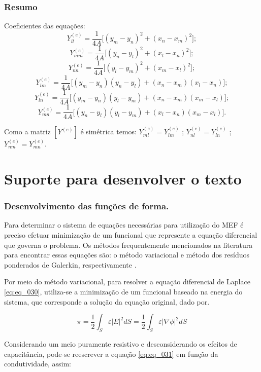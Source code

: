 \documentclass[
12pt,
a4paper,
oneside,
chapter=TITLE,
sumario=tradicional
]{abntex2}
\begin{document}
\subsection*{Resumo}


Coeficientes das equações:
$$
\boxed{Y_{ll}^{(e)} = \frac{1}{4A}\Big[(y_m - y_n)^2 + (x_n - x_m)^2\Big]; }
$$
$$
\boxed{Y_{mm}^{(e)} = \frac{1}{4A}\Big[(y_n - y_l)^2 + (x_l - x_n)^2\Big]; }
$$
$$
\boxed{Y_{nn}^{(e)} = \frac{1}{4A}\Big[(y_l - y_m)^2 + (x_m - x_l)^2\Big]; }
$$
$$
\boxed{Y_{lm}^{(e)} = \frac{1}{4A} \Big[ (y_m - y_n)(y_n - y_l) + (x_n - x_m)(x_l - x_n) \Big]; }
$$
$$
\boxed{Y_{ln}^{(e)} = \frac{1}{4A}\Big[(y_m - y_n)(y_l - y_m) + (x_n - x_m)(x_m - x_l)\Big]; }
$$
$$
\boxed{Y_{mn}^{(e)} = \frac{1}{4A}\Big[(y_n - y_l)(y_l - y_m) + (x_l - x_n)(x_m - x_l)\Big]. }
$$

Como a matriz $[Y^{(e)}]$ é simétrica temos:  $Y_{ml}^{(e)} = Y_{lm}^{(e)}$ ; $Y_{nl}^{(e)} = Y_{ln}^{(e)}$ ; $Y_{nm}^{(e)} = Y_{mn}^{(e)}$.






\chapter{Suporte para desenvolver o texto} \label{App:Suporte}
\subsection*{Desenvolvimento das funções de forma.}

Para determinar o sistema de equações necessárias para utilização do MEF é preciso efetuar  minimização de um funcional que represente a equação diferencial que governa o problema. Os métodos frequentemente mencionados na literatura para encontrar essas equações são: o método variacional e método  dos resíduos ponderados de Galerkin, respectivamente \cite{roberto2019electromagnetics}. 



Por meio do método variacional, para resolver a equação diferencial de Laplace \ref{eq:eq_030}, utiliza-se a minimização de um funcional baseado na energia do sistema,  que corresponde a solução da equação original, dado por.


\begin{equation}
	\pi = \frac{1}{2}\int_S \varepsilon |E|^2 dS= \frac{1}{2}\int_S \varepsilon |\nabla \phi|^2 dS
	\label{eq:eq_031}
\end{equation}


Considerando um meio puramente resistivo e desconsiderando os efeitos de capacitância, pode-se reescrever a equação \ref{eq:eq_031} em função da condutividade, assim:
\end{document}
